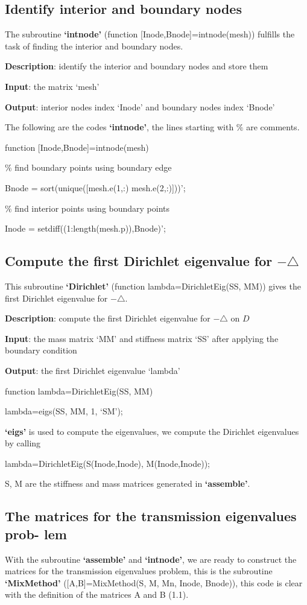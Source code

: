 \documentclass[12pt]{article}%
\numberwithin{equation}{section}
\numberwithin{remark}{section}
\numberwithin{example}{section}
\begin{document}
 \subsection{Identify interior and boundary nodes}
 The subroutine \textbf{`intnode'} (function [Inode,Bnode]=intnode(mesh)) fulfills
the task of finding the interior and boundary nodes.

\textbf{Description}: identify the interior and boundary nodes and store them

\textbf{Input}: the matrix `mesh'

\textbf{Output}: interior nodes index `Inode' and boundary nodes index `Bnode'

The following are the codes \textbf{`intnode'}, the lines starting with $\%$ are
comments.
 \begin{shaded}
 function [Inode,Bnode]=intnode(mesh)

$\%$ find boundary points using boundary edge

Bnode = sort(unique([mesh.e(1,:) mesh.e(2,:)]))';

$\%$ find interior points using boundary points

Inode = setdiff((1:length(mesh.p)),Bnode)';
 \end{shaded}
 \subsection{Compute the first Dirichlet eigenvalue for $-\triangle$}
 This subroutine \textbf{`Dirichlet'} (function lambda=DirichletEig(SS, MM)) gives
the first Dirichlet eigenvalue for $-\triangle$.

\textbf{Description}: compute the first Dirichlet eigenvalue for $-\triangle$ on $D$

\textbf{Input}: the mass matrix `MM' and stiffness matrix `SS' after applying
the boundary condition

\textbf{Output}: the first Dirichlet eigenvalue `lambda'
 \begin{shaded}
 function lambda=DirichletEig(SS, MM)

lambda=eigs(SS, MM, 1, `SM');
 \end{shaded}
\textbf{ `eigs'} is used to compute the eigenvalues, we compute the Dirichlet eigenvalues
by calling
\begin{shaded}
lambda=DirichletEig(S(Inode,Inode), M(Inode,Inode));
\end{shaded}
S, M are the stiffness and mass matrices generated in \textbf{`assemble'}.
\subsection{The matrices for the transmission eigenvalues prob-
lem}
With the subroutine \textbf{`assemble'} and \textbf{`intnode'}, we are ready to construct
the matrices for the transmission eigenvalues problem, this is the subroutine
\textbf{`MixMethod'} ([A,B]=MixMethod(S, M, Mn, Inode, Bnode)), this code is
clear with the definition of the matrices A and B (1.1).
\end{document}
